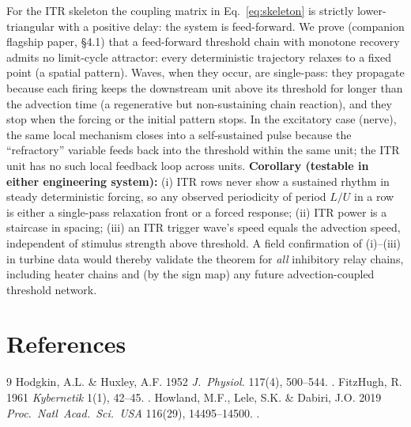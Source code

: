 \documentclass[11pt]{article}
\begin{document}
For the ITR skeleton the coupling matrix in Eq.~\eqref{eq:skeleton} is strictly lower-triangular
with a positive delay: the system is feed-forward. We prove (companion flagship paper, \S4.1)
that a feed-forward threshold chain with monotone recovery admits no limit-cycle attractor:
every deterministic trajectory relaxes to a fixed point (a spatial pattern). Waves, when they
occur, are single-pass: they propagate because each firing keeps the downstream unit above its
threshold for longer than the advection time (a regenerative but non-sustaining chain
reaction), and they stop when the forcing or the initial pattern stops. In the excitatory
case (nerve), the same local mechanism closes into a self-sustained pulse because the
``refractory'' variable feeds back into the threshold within the same unit; the ITR unit has
no such local feedback loop across units. \textbf{Corollary (testable in either
engineering system):} (i) ITR rows never show a sustained rhythm in steady deterministic
forcing, so any observed periodicity of period $L/U$ in a row is either a single-pass relaxation front or a forced response; (ii) ITR power is a staircase in spacing; (iii) an
ITR trigger wave's speed equals the advection speed, independent of stimulus strength above
threshold. A field confirmation of (i)--(iii) in turbine data would thereby validate the
theorem for \emph{all} inhibitory relay chains, including heater chains and (by the sign
map) any future advection-coupled threshold network.

\section*{References}
\begin{thebibliography}{9}
 Hodgkin, A.L. \& Huxley, A.F. 1952 \emph{J.\ Physiol.} 117(4), 500--544. .
 FitzHugh, R. 1961 \emph{Kybernetik} 1(1), 42--45. .
 Howland, M.F., Lele, S.K. \& Dabiri, J.O. 2019 \emph{Proc.\ Natl\ Acad.\ Sci.\ USA} 116(29), 14495--14500. .
\end{thebibliography}
\end{document}
